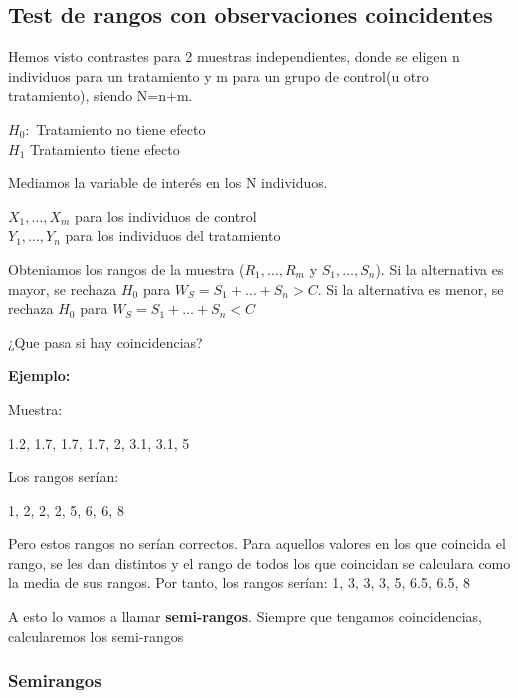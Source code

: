 \subsection{Test de rangos con observaciones coincidentes}

Hemos visto contrastes para 2 muestras independientes, donde se eligen n individuos para un tratamiento y m para un grupo de control(u otro tratamiento), siendo N=n+m.
\begin{center}
    $H_0: $ Tratamiento no tiene efecto \\
    $H_1$ Tratamiento tiene efecto
\end{center}

Mediamos la variable de interés en los N individuos.
\begin{center}
    $X_1,\dots,X_m$ para los individuos de control \\
    $Y_1,\dots,Y_n$ para los individuos del tratamiento
\end{center}

Obteniamos los rangos de la muestra ($R_1,\dots,R_m$ y $S_1,\dots,S_n$).
Si la alternativa es mayor, se rechaza $H_0$ para $W_S=S_1+\dots+S_n>C$.
Si la alternativa es menor, se rechaza $H_0$ para $W_S=S_1+\dots+S_n<C$

¿Que pasa si hay coincidencias?

\newpage

\textbf{Ejemplo: }

Muestra:

\begin{center}
    1.2, 1.7, 1.7, 1.7, 2, 3.1, 3.1, 5
\end{center}

Los rangos serían:

\begin{center}
    1, 2, 2, 2, 5, 6, 6, 8
\end{center}

Pero estos rangos no serían correctos. Para aquellos valores en los que coincida el rango, se les dan distintos y el rango de todos los que coincidan se calculara como la media de sus rangos. Por tanto, los rangos serían:
1, 3, 3, 3, 5, 6.5, 6.5, 8

A esto lo vamos a llamar \textbf{semi-rangos}. Siempre que tengamos coincidencias, calcularemos los semi-rangos

\subsubsection{Semirangos}

